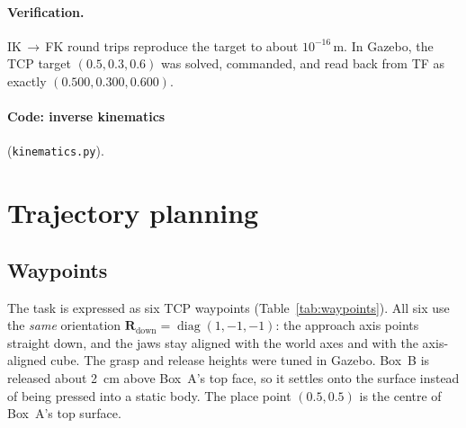 \documentclass[11pt,a4paper]{article}
\newcommand{\src}{../src/gp7_pick_place/gp7_pick_place}
\begin{document}
\paragraph{Verification.}
IK\,\(\to\)\,FK round trips reproduce the target to about \(10^{-16}\)\,m. In Gazebo, the TCP
target \((0.5, 0.3, 0.6)\) was solved, commanded, and read back from TF as exactly
\((0.500, 0.300, 0.600)\).

\paragraph{Code: inverse kinematics} (\texttt{kinematics.py}).




\section{Trajectory planning}

\subsection{Waypoints}
The task is expressed as six TCP waypoints (Table~\ref{tab:waypoints}). All six use the
\emph{same} orientation \(\mathbf R_\text{down}=\operatorname{diag}(1,-1,-1)\): the
approach axis points straight down, and the jaws stay aligned with the world axes and
with the axis-aligned cube.
The grasp and release heights were tuned in Gazebo. Box~B is released about
\SI{2}{cm} above Box~A's top face, so it settles onto the surface instead of being
pressed into a static body. The place point \((0.5, 0.5)\) is the centre of Box~A's top
surface.
\end{document}
